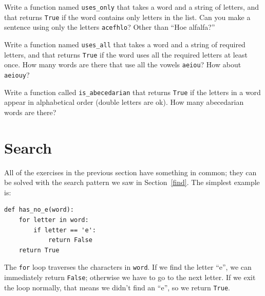 \documentclass[10pt]{book}
\begin{document}
\begin{ex}
Write a function named \verb"uses_only" that takes a word and a
string of letters, and that returns {\tt True} if the word contains
only letters in the list.  Can you make a sentence using only the
letters {\tt acefhlo}?  Other than ``Hoe alfalfa?''
\end{ex}


\begin{ex} 
Write a function named \verb"uses_all" that takes a word and a
string of required letters, and that returns {\tt True} if the word
uses all the required letters at least once.  How many words are there
that use all the vowels {\tt aeiou}?  How about {\tt aeiouy}?
\end{ex}


\begin{ex}
Write a function called \verb"is_abecedarian" that returns
{\tt True} if the letters in a word appear in alphabetical order
(double letters are ok).  
How many abecedarian words are there?
\end{ex}







\section{Search}


All of the exercises in the previous section have something
in common; they can be solved with the search pattern we saw
in Section~\ref{find}.  The simplest example is:

\beforeverb
\begin{verbatim}
def has_no_e(word):
    for letter in word:
        if letter == 'e':
            return False
    return True
\end{verbatim}
\afterverb
%
The {\tt for} loop traverses the characters in {\tt word}.  If we find
the letter ``e'', we can immediately return {\tt False}; otherwise we
have to go to the next letter.  If we exit the loop normally, that
means we didn't find an ``e'', so we return {\tt True}.
\end{document}
